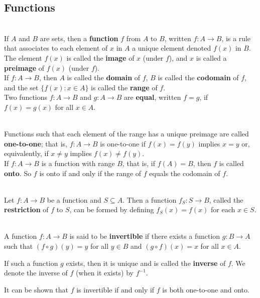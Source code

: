 \begin{alphasection}
	\setcounter{alphasect}{1}
	\section{Functions}

	\begin{definition}
		\hfill\\
		If $A$ and $B$ are sets, then a \textbf{function} $f$ from $A$ to $B$, written $f: A \to B$, is a rule that associates to each element of $x$ in $A$ a unique element denoted $f(x)$ in $B$.\\

		The element $f(x)$ is called the \textbf{image} of $x$ (under $f$), and $x$ is called a \textbf{preimage} of $f(x)$ (under $f$).\\

		If $f: A \to B$, then $A$ is called the \textbf{domain} of $f$, $B$ is called the \textbf{codomain} of $f$, and the set $\{f(x) : x \in A\}$ is called the \textbf{range} of $f$.\\

		Two functions $f: A \to B$ and $g: A \to B$ are \textbf{equal}, written $f=g$, if $f(x) = g(x)$ for all $x \in A$.
	\end{definition}

	\begin{definition}
		\hfill\\
		Functions such that each element of the range has a unique preimage are called \textbf{one-to-one}; that is, $f: A \to B$ is one-to-one if $f(x) = f(y)$ implies $x=y$ or, equivalently, if $x \neq y$ implies $f(x) \neq f(y)$.\\

		If $f: A \to B$ is a function with range $B$, that is, if $f(A) = B$, then $f$ is called \textbf{onto}. So $f$ is onto if and only if the range of $f$ equals the codomain of $f$.
	\end{definition}

	\begin{definition}
		\hfill\\
		Let $f: A \to B$ be a function and $S \subseteq A$. Then a function $f_S: S \to B$, called the \textbf{restriction} of $f$ to $S$, can be formed by defining $f_S(x) = f(x)$ for each $x \in S$.
	\end{definition}

	\begin{definition}
		\hfill\\
		A function $f: A \to B$ is said to be \textbf{invertible} if there exists a function $g: B \to A$ such that $(f \circ g)(y) = y$ for all $y \in B$ and $(g \circ f)(x)=x$ for all $x \in A$.

		If such a function $g$ exists, then it is unique and is called the \textbf{inverse} of $f$. We denote the inverse of $f$ (when it exists) by $f^{-1}$.

		It can be shown that $f$ is invertible if and only if $f$ is both one-to-one and onto.
	\end{definition}
\end{alphasection}
